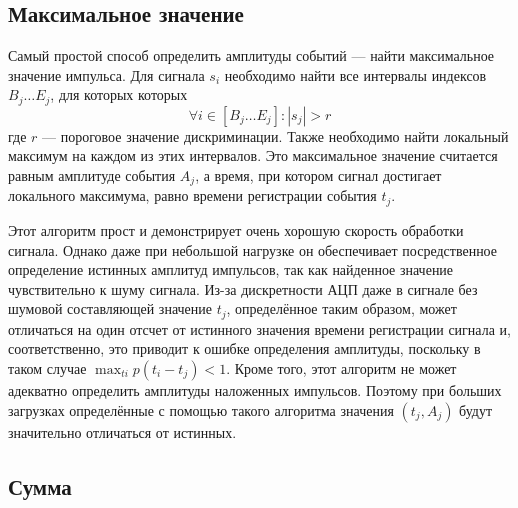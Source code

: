 
\subsection{Максимальное значение}

Самый простой способ определить амплитуды событий --- найти максимальное значение импульса. Для сигнала $s_i$ необходимо найти все интервалы индексов $B_j \ldots E_j$, для которых которых 
\begin{equation}
  \label{eq:PulseInterval}
  \forall i \in \left[ B_j \ldots E_j \right]: |s_j| > r
\end{equation}
где $r$ --- пороговое значение дискриминации. Также необходимо найти локальный максимум на каждом из этих интервалов. Это максимальное значение считается равным амплитуде события $A_j$, а время, при котором сигнал достигает локального максимума, равно времени регистрации события $t_j$.~\cite{Khilkevitch2020}

Этот алгоритм прост и демонстрирует очень хорошую скорость обработки сигнала. Однако даже при небольшой нагрузке он обеспечивает посредственное определение истинных амплитуд импульсов, так как найденное значение чувствительно к шуму сигнала. Из-за дискретности АЦП даже в сигнале без шумовой составляющей значение $t_j$, определённое таким образом, может отличаться на один отсчет от истинного значения времени регистрации сигнала и, соответственно, это приводит к ошибке определения амплитуды, поскольку в таком случае $ \max_{ti} p(t_i - t_j ) < 1 $. Кроме того, этот алгоритм не может адекватно определить амплитуды наложенных импульсов. Поэтому при больших загрузках определённые с помощью такого алгоритма значения $(t_j, A_j)$ будут значительно отличаться от истинных.~\cite{Khilkevitch2020}


\subsection{Сумма}
\label{sec:ProcessingSum}

